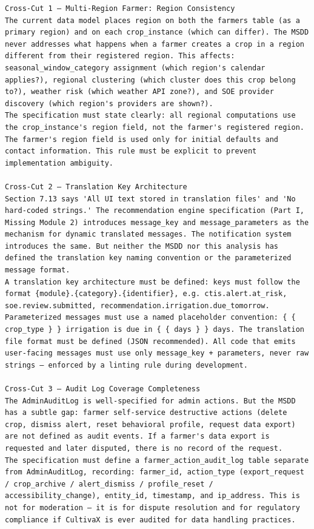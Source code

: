 \documentclass{article}
\begin{document}
\begin{verbatim}
Cross-Cut 1 — Multi-Region Farmer: Region Consistency
The current data model places region on both the farmers table (as a primary region) and on each crop_instance (which can differ). The MSDD never addresses what happens when a farmer creates a crop in a region different from their registered region. This affects: seasonal_window_category assignment (which region's calendar applies?), regional clustering (which cluster does this crop belong to?), weather risk (which weather API zone?), and SOE provider discovery (which region's providers are shown?).
The specification must state clearly: all regional computations use the crop_instance's region field, not the farmer's registered region. The farmer's region field is used only for initial defaults and contact information. This rule must be explicit to prevent implementation ambiguity.

Cross-Cut 2 — Translation Key Architecture
Section 7.13 says 'All UI text stored in translation files' and 'No hard-coded strings.' The recommendation engine specification (Part I, Missing Module 2) introduces message_key and message_parameters as the mechanism for dynamic translated messages. The notification system introduces the same. But neither the MSDD nor this analysis has defined the translation key naming convention or the parameterized message format.
A translation key architecture must be defined: keys must follow the format {module}.{category}.{identifier}, e.g. ctis.alert.at_risk, soe.review.submitted, recommendation.irrigation.due_tomorrow. Parameterized messages must use a named placeholder convention: { { crop_type } } irrigation is due in { { days } } days. The translation file format must be defined (JSON recommended). All code that emits user-facing messages must use only message_key + parameters, never raw strings — enforced by a linting rule during development.

Cross-Cut 3 — Audit Log Coverage Completeness
The AdminAuditLog is well-specified for admin actions. But the MSDD has a subtle gap: farmer self-service destructive actions (delete crop, dismiss alert, reset behavioral profile, request data export) are not defined as audit events. If a farmer's data export is requested and later disputed, there is no record of the request.
The specification must define a farmer_action_audit_log table separate from AdminAuditLog, recording: farmer_id, action_type (export_request / crop_archive / alert_dismiss / profile_reset / accessibility_change), entity_id, timestamp, and ip_address. This is not for moderation — it is for dispute resolution and for regulatory compliance if CultivaX is ever audited for data handling practices.


\end{verbatim}
\end{document}
